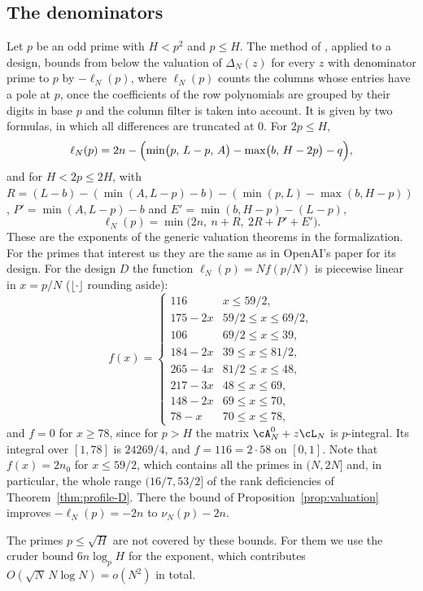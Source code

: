 \subsection{The denominators}
Let $p$ be an odd prime with $H<p^2$ and $p\le H$. The method of \cite[\S3]{OpenAI2026}, applied to a
design, bounds from below the valuation of $\Delta_N(z)$ for every $z$ with denominator prime to $p$ by
$-\ell_N(p)$, where $\ell_N(p)$ counts the columns whose entries have a pole at $p$, once the coefficients of
the row polynomials are grouped by their digits in base $p$ and the column filter is taken into account. It
is given by two formulas, in which all differences are truncated at $0$. For $2p\le H$,
\[
 \ell_N(p)=2n-\Bigl(\min\bigl(p,\,L-p,\,A\bigr)-\max\bigl(b,\,H-2p\bigr)-q\Bigr),
\]
and for $H<2p\le2H$, with $R=(L-b)-(\min(A,L-p)-b)-(\min(p,L)-\max(b,H-p))$,
$P'=\min(A,L-p)-b$ and $E'=\min(b,H-p)-(L-p)$,
\[
 \ell_N(p)=\min\bigl(2n,\ n+R,\ 2R+P'+E'\bigr).
\]
These are the exponents of the generic valuation theorems in the formalization. For the primes that
interest us they are the same as in OpenAI's paper for its design. For the design $D$ the function
$\ell_N(p)=Nf(p/N)$ is piecewise linear in $x=p/N$ ($\lfloor\cdot\rfloor$ rounding aside):
\[
 f(x)=\begin{cases}
 116&x\le59/2,\\
 175-2x&59/2\le x\le69/2,\\
 106&69/2\le x\le39,\\
 184-2x&39\le x\le81/2,\\
 265-4x&81/2\le x\le48,\\
 217-3x&48\le x\le69,\\
 148-2x&69\le x\le70,\\
 78-x&70\le x\le78,
 \end{cases}
\]
and $f=0$ for $x\ge78$, since for $p>H$ the matrix $\cA^0_N+z\cL_N$ is $p$-integral. Its integral over
$[1,78]$ is $24269/4$, and $f=116=2\cdot58$ on $[0,1]$. Note that $f(x)=2n_0$ for $x\le59/2$, which
contains all the primes in $(N,2N]$ and, in particular, the whole range $(16/7,53/2]$ of the rank
deficiencies of Theorem~\ref{thm:profile-D}. There the bound of Proposition~\ref{prop:valuation} improves
$-\ell_N(p)=-2n$ to $\nu_N(p)-2n$.

The primes $p\le\sqrt H$ are not covered by these bounds. For them we use the cruder bound
$6n\log_pH$ for the exponent, which contributes $O(\sqrt N\,N\log N)=o(N^2)$ in total.

